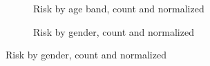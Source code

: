 \documentclass{article}
\begin{document}
\begin{figure}[ht!]
\begin{subfigure}{.45\textwidth}
		\caption{Risk by age band, count and normalized}
		\label{fig:risk_by_age_all}
	\end{subfigure}
	\begin{subfigure}{.45\textwidth}
		\centering
		\caption{Risk by gender, count and normalized}
		\label{fig:risk_by_gender_all}
	\end{subfigure}


\end{figure}
\end{document}
